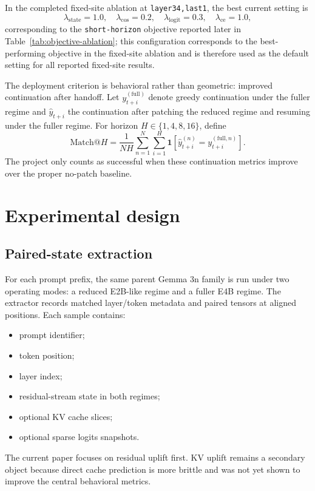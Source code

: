 \documentclass[11pt]{article}
\newcommand{\method}[1]{\texttt{#1}}
\newcommand{\full}{\mathrm{full}}
\begin{document}
In the completed fixed-site ablation at \method{layer34,last1}, the best current setting is
\[
\lambda_{\text{state}}=1.0,\quad
\lambda_{\cos}=0.2,\quad
\lambda_{\text{logit}}=0.3,\quad
\lambda_{\text{ce}}=1.0,
\]
corresponding to the \texttt{short-horizon} objective reported later in Table~\ref{tab:objective-ablation}; this configuration corresponds to the best-performing objective in the fixed-site ablation and is therefore used as the default setting for all reported fixed-site results.

The deployment criterion is behavioral rather than geometric: improved continuation after handoff. Let $y^{(\full)}_{t+i}$ denote greedy continuation under the fuller regime and $\hat{y}_{t+i}$ the continuation after patching the reduced regime and resuming under the fuller regime. For horizon $H \in \{1,4,8,16\}$, define
\[
\mathrm{Match}@H
= \frac{1}{NH}\sum_{n=1}^N \sum_{i=1}^{H}
\mathbf{1}\!\left[\hat{y}^{(n)}_{t+i} = y^{(\full,n)}_{t+i}\right].
\]
The project only counts as successful when these continuation metrics improve over the proper no-patch baseline.

\section{Experimental design}
\subsection{Paired-state extraction}
For each prompt prefix, the same parent Gemma 3n family is run under two operating modes: a reduced E2B-like regime and a fuller E4B regime. The extractor records matched layer/token metadata and paired tensors at aligned positions. Each sample contains:
\begin{itemize}[leftmargin=1.4em]
    \item prompt identifier;
    \item token position;
    \item layer index;
    \item residual-stream state in both regimes;
    \item optional KV cache slices;
    \item optional sparse logits snapshots.
\end{itemize}

The current paper focuses on residual uplift first. KV uplift remains a secondary object because direct cache prediction is more brittle and was not yet shown to improve the central behavioral metrics.
\end{document}
